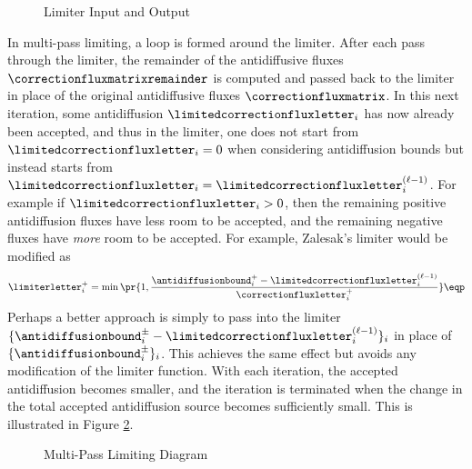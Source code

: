 \begin{figure}[htb]
   \centering
     
      \caption{Limiter Input and Output}
   \label{fig:limiting_coefficients}
\end{figure}

In multi-pass limiting, a loop is formed around the limiter. After each pass
through the limiter, the remainder of the antidiffusive fluxes
$\correctionfluxmatrixremainder$ is computed and passed back to the limiter
in place of the original antidiffusive fluxes $\correctionfluxmatrix$. In
this next iteration, some antidiffusion $\limitedcorrectionfluxletter_i$
has now already been accepted, and thus in the limiter, one does not start
from $\limitedcorrectionfluxletter_i=0$ when considering antidiffusion bounds but instead
starts from $\limitedcorrectionfluxletter_i=\limitedcorrectionfluxletter_i^{(\ell-1)}$.
For example if $\limitedcorrectionfluxletter_i>0$, then the remaining positive
antidiffusion fluxes have less room to be accepted, and the remaining negative
fluxes have \emph{more} room to be accepted. For example, Zalesak's limiter
would be modified as
\[
  \limiterletter_i^+ = \min\pr{1,\frac{\antidiffusionbound_i^+
    - \limitedcorrectionfluxletter_i^{(\ell-1)}}
    {\correctionfluxletter_i^+}} \eqp
\]
Perhaps a better approach is simply to pass into the limiter
$\{\antidiffusionbound_i^\pm-\limitedcorrectionfluxletter_i^{(\ell-1)}\}_i$ 
in place of $\{\antidiffusionbound_i^\pm\}_i$. This achieves the same effect but
avoids any modification of the limiter function.
With each iteration, the accepted antidiffusion becomes smaller,
and the iteration is terminated when the change in the total accepted
antidiffusion source becomes sufficiently small. This is illustrated in
Figure \ref{fig:multipass_limiting}.

\begin{figure}[htb]
   \centering
     
      \caption{Multi-Pass Limiting Diagram}
   \label{fig:multipass_limiting}
\end{figure}

